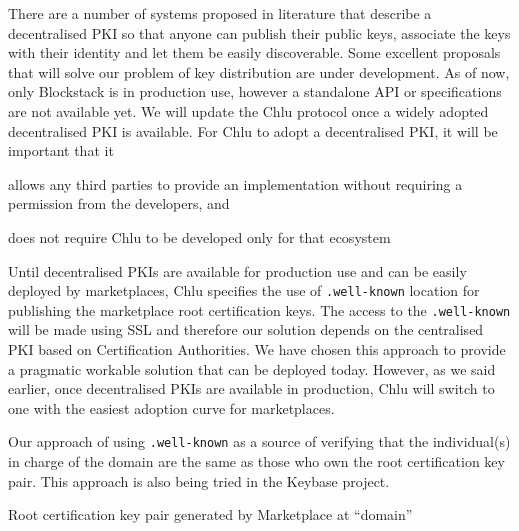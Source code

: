 \documentclass[a4paper]{article}
\begin{document}
There are a number of systems proposed in literature that describe a
decentralised PKI so that anyone can publish their public keys,
associate the keys with their identity and let them be easily
discoverable. Some excellent proposals that will solve our problem of
key distribution are under
development\cite{blockstack,fromknecht2014decentralized,kulynychdecentralizing,rwot-dpki,IKP,morselli2006keychains}.
As of now, only Blockstack is in production use, however a standalone
API or specifications are not available yet. We will update the Chlu
protocol once a widely adopted decentralised PKI is available. For
Chlu to adopt a decentralised PKI, it will be important that
it
\begin{enumerate*}[label=(\roman*)]
\item allows any third parties to provide an implementation without
  requiring a permission from the developers, and
\item does not require Chlu to be developed only for that ecosystem
\end{enumerate*}

Until decentralised PKIs are available for production use and can be
easily deployed by marketplaces, Chlu specifies the use of
\texttt{.well-known}\cite{wellknown} location for publishing the
marketplace root certification keys. The access to the
\texttt{.well-known} will be made using SSL and therefore our solution
depends on the centralised PKI based on Certification Authorities. We
have chosen this approach to provide a pragmatic workable solution
that can be deployed today. However, as we said earlier, once
decentralised PKIs are available in production, Chlu will switch to
one with the easiest adoption curve for marketplaces.

Our approach of using \texttt{.well-known} as a source of verifying
that the individual(s) in charge of the domain are the same as those
who own the root certification key pair. This approach is also being
tried in the Keybase project\cite{keybase}.

\begin{algorithm}
  \caption{Root certification key pair generated by Marketplace at ``domain''}\label{algo:marketplace-root-key-generation}
  \begin{algorithmic}
  \end{algorithmic}    
\end{algorithm}
\end{document}
